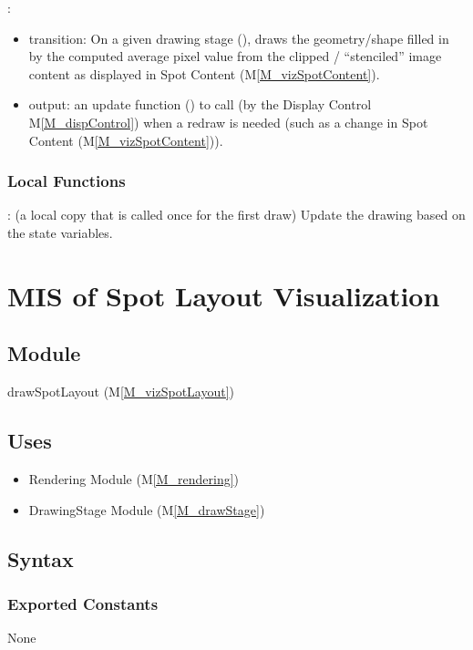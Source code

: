 \documentclass[12pt, titlepage]{article}
\newcommand{\mref}[1]{M\ref{#1}}
\newcommand{\mrefp}[1]{(\mref{#1})}
\newcommand{\mreff}[1]{Module \mrefp{#1}}
\begin{document}
\noindent {}:
\begin{itemize}
  \item transition: On a given drawing stage (),
  draws the  geometry/shape filled in by the computed average pixel value
  from the clipped / ``stenciled'' image content as displayed in
  Spot Content \mrefp{M_vizSpotContent}.
\item output: an update function ()
  to call (by the Display Control \mref{M_dispControl})
  when a redraw is needed (such as a change in Spot Content \mrefp{M_vizSpotContent}).
\end{itemize}

\subsubsection{Local Functions}
: (a local copy that is called once for the first draw)
  Update the drawing based on the state variables.

\newpage



\section{MIS of Spot Layout Visualization} \label{MS_vizSpotLayout}

\subsection{Module}
drawSpotLayout \mrefp{M_vizSpotLayout}

\subsection{Uses}
\begin{itemize}
  \item Rendering \mreff{M_rendering}
  \item DrawingStage \mreff{M_drawStage}
\end{itemize}

\subsection{Syntax}

\subsubsection{Exported Constants}
None
\end{document}
